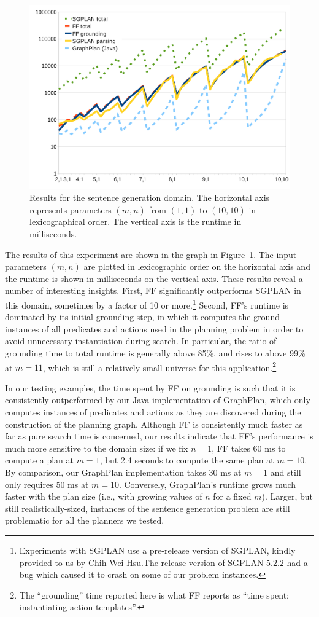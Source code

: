 \documentclass[letterpaper]{article}
\begin{document}
\begin{figure}
  \centering
  \includegraphics[width=0.75\columnwidth]{graph-exp1}
  \caption{Results for the sentence generation domain. The
    horizontal axis represents parameters $(m,n)$ from $(1,1)$ to
    $(10,10)$ in lexicographical order. The vertical axis is the
    runtime in milliseconds.}
  \label{fig:runtimes-crisp}
\end{figure}

The results of this experiment are shown in the graph in
Figure~\ref{fig:runtimes-crisp}. The input parameters $(m,n)$ are plotted
in lexicographic order on the horizontal axis and the runtime is shown in
milliseconds on the vertical axis. These results reveal a number of
interesting insights. First, FF significantly outperforms SGPLAN in this
domain, sometimes by a factor of 10 or more.\footnote{Experiments with
 SGPLAN use a pre-release version of SGPLAN, kindly provided to us by
 Chih-Wei Hsu.The release version of SGPLAN 5.2.2 had a bug which caused it
 to crash on some of our problem instances.}
Second, FF's runtime is dominated by its initial grounding step, in which
it computes the ground instances of all predicates and actions used in the
planning problem in order to avoid unnecessary instantiation during search.
In particular, the ratio of grounding time to total runtime is generally
above 85\%, and rises to above 99\% at $m=11$, which is still a relatively
small universe for this application.\footnote{The
  ``grounding'' time reported here is what FF reports as ``time spent:
  instantiating action templates''.} 

In our testing examples, the time spent by FF on grounding is such that it
is consistently outperformed by our Java implementation of GraphPlan, which
only computes instances of predicates and actions as they are discovered
during the construction of the planning graph. Although FF is consistently
much faster as far as pure search time is concerned, our results indicate
that FF's performance is much more sensitive to the domain size: if we fix
$n=1$, FF takes 60 ms to compute a plan at $m=1$, but 2.4 seconds to
compute the same plan at $m=10$. By comparison, our GraphPlan
implementation takes 30 ms at $m=1$ and still only requires 50 ms at
$m=10$. Conversely, GraphPlan's runtime grows much faster with the plan
size (i.e., with growing values of $n$ for a fixed $m$). Larger, but still
realistically-sized, instances of the sentence generation problem are still
problematic for all the planners we tested.
\end{document}
